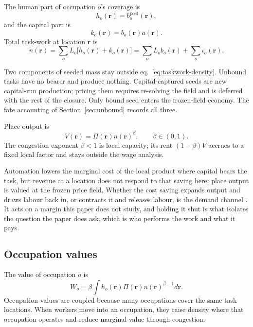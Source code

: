 \documentclass[12pt, a4paper]{article}
\begin{document}
The human part of occupation $o$'s coverage is
\[
  h_o(\mathbf{r}) = b_o^{\text{post}}(\mathbf{r}),
\]
and the capital part is
\[
  k_o(\mathbf{r}) = b_o(\mathbf{r})a(\mathbf{r}).
\]
Total task-work at location $\mathbf{r}$ is
\begin{equation}
  n(\mathbf{r})
  =
  \sum_o L_o
  \bigl[
    h_o(\mathbf{r}) + k_o(\mathbf{r})
  \bigr]
  =
  \sum_o L_o b_o(\mathbf{r})
  +
  \sum_o \iota_o(\mathbf{r}).
  \label{eq:taskwork-density}
\end{equation}

Two components of seeded mass stay outside
eq.~\eqref{eq:taskwork-density}. Unbound tasks have no bearer and
produce nothing. Capital-captured seeds are new capital-run production;
pricing them requires re-solving the field and is deferred with the rest
of the closure. Only bound seed enters the frozen-field economy. The
fate accounting of Section~\ref{sec:unbound} records all three.

Place output is
\begin{equation}
  V(\mathbf{r})
  =
  \Pi(\mathbf{r})
  n(\mathbf{r})^\beta,
  \qquad \beta\in(0,1).
  \label{eq:place-output}
\end{equation}
The congestion exponent $\beta<1$ is local capacity; its rent
$(1-\beta)V$ accrues to a fixed local factor and stays outside the wage
analysis.

Automation lowers the marginal cost of the local product where capital
bears the task, but revenue at a location does not respond to that
saving here: place output is valued at the frozen price field. Whether
the cost saving expands output and draws labour back in, or contracts it
and releases labour, is the demand channel
\parencite{bessen2019demand}. It acts on a margin this paper does not
study, and holding it shut is what isolates the question the paper does
ask, which is who performs the work and what it pays.

\subsection{Occupation values}
\label{sec:occupation-values}

The value of occupation $o$ is
\begin{equation}
  W_o
  =
  \beta
  \int
  h_o(\mathbf{r})
  \Pi(\mathbf{r})
  n(\mathbf{r})^{\beta-1}
  d\mathbf{r}.
  \label{eq:occ-value}
\end{equation}
Occupation values are coupled because many occupations cover the same
task locations. When workers move into an occupation, they raise density
where that occupation operates and reduce marginal value through
congestion.
\end{document}
